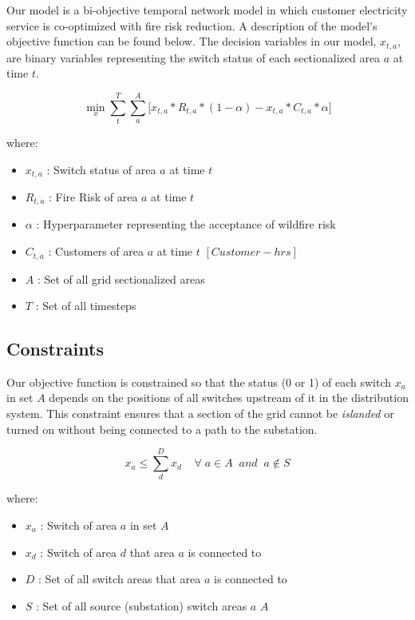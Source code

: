 \documentclass{article}
\begin{document}
Our model is a bi-objective temporal network model in which customer electricity service is co-optimized with fire risk reduction. A description of the model's objective function can be found below. The decision variables in our model, $x_{t,a}$, are binary variables representing the switch status of each sectionalized area $a$ at time $t$.

\begin{equation}
    \min_{x} {\sum_{t}^{T}\sum_{a}^{A} [x_{t,a} * R_{t,a} * (1 - \alpha) - x_{t,a} * C_{t,a} * \alpha}]
\end{equation}

where:
\begin{itemize}
    \item $x_{t,a}$ : Switch status of area $a$ at time $t$
    \item $R_{t,a}$ :  Fire Risk of area $a$ at time $t$
    \item $\alpha$ : Hyperparameter representing the acceptance of wildfire risk
    \item $C_{t,a}$ : Customers of area $a$ at time $t$ $[Customer-hrs]$
    \item $A$ : Set of all grid sectionalized areas
    \item $T$ : Set of all timesteps
\end{itemize}

\subsection{Constraints}
Our objective function is constrained so that the status (0 or 1) of each switch $x_{a}$ in set $A$ depends on the positions of all switches upstream of it in the distribution system. This constraint ensures that a section of the grid cannot be \emph{islanded} or turned on without being connected to a path to the substation.

\begin{equation}
     x_{a} \leq {\sum_{d}^{D} x_{d}}  \;\;\;\;  \forall \; a \in A \;\; and \;\; a \not\in  S
\end{equation}

where:
\begin{itemize}
    \item $x_{a}$ : Switch of area $a$ in set $A$
    \item $x_{d}$ : Switch of area $d$ that area $a$ is connected to
    \item $D$ : Set of all switch areas that area $a$ is connected to
    \item $S$ : Set of all source (substation) switch areas $a$ \in $A$

\end{itemize}
\end{document}
